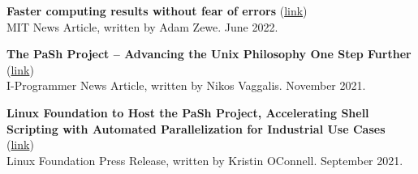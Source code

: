 \documentclass[margin]{res}
\begin{document}
\begin{resume}
\textbf{Faster computing results without fear of errors} (\href{https://news.mit.edu/2022/faster-unix-computing-program-0607}{link}) \\
MIT News Article, written by Adam Zewe. June 2022.

\textbf{The PaSh Project -- Advancing the Unix Philosophy One Step Further} (\href{https://www.i-programmer.info/news/90-tools/14990-the-pash-project-advancing-the-unix-philosophy-one-step-further.html}{link}) \\
I-Programmer News Article, written by Nikos Vaggalis. November 2021.

\textbf{Linux Foundation to Host the PaSh Project, Accelerating Shell Scripting with Automated Parallelization for Industrial Use Cases} (\href{https://www.linuxfoundation.org/press/press-release/linux-foundation-to-host-the-pash-project-accelerating-shell-scripting-with-automated-parallelization-for-industrial-use-cases}{link}) \\
Linux Foundation Press Release, written by Kristin OConnell. September 2021.











\end{resume}
\end{document}

